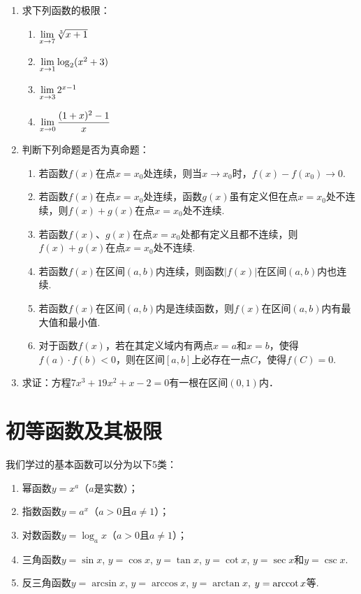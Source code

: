 \begin{ex}
\begin{enumerate}
    \item 求下列函数的极限：
\begin{multicols}{2}
\begin{enumerate}[(1)]
    \item $\lim\limits_{x\to 7}\sqrt[3]{x+1}$
    \item $\lim\limits_{x\to 1}\log_2(x^2+3)$
    \item $\lim\limits_{x\to 3}2^{x-1}$
    \item $\lim\limits_{x\to 0}\dfrac{(1+x)^2-1}{x}$
\end{enumerate}
\end{multicols}
\item 判断下列命题是否为真命题：
\begin{enumerate}[(1)]
\item 若函数$f(x)$在点$x=x_0$处连续，则当$x\to x_0$时，$f(x)-f(x_0)\to 0$.
\item 若函数$f(x)$在点$x=x_0$处连续，函数$g(x)$虽有定义但在点$x=x_0$处不连续，则$f(x)+g(x)$在点$x=x_0$处不连续.
\item 若函数$f(x)$、$g(x)$在点$x=x_0$处都有定义且都不连续，则$f(x)+g(x)$在点$x=x_0$处不连续.
\item 若函数$f(x)$在区间$(a,b)$内连续，则函数$|f(x)|$在区间$(a,b)$内也连续.
\item 若函数$f(x)$在区间$(a,b)$内是连续函数，则$f(x)$在区间$(a,b)$内有最大值和最小值.
\item 对于函数$f(x)$，若在其定义域内有两点$x=a$和$x=b$，使得$f(a)\cdot f(b)<0$，则在区间$[a,b]$上必存在一点$C$，使得$f(C)=0$.
\end{enumerate}

\item 求证：方程$7x^3+19x^2+x-2=0$有一根在区间$(0,1)$内．
\end{enumerate}
\end{ex}

\section{初等函数及其极限}

我们学过的基本函数可以分为以下5类：
\begin{enumerate}
\item 幂函数$y=x^{a}$（$a$是实数）；
\item 指数函数$y=a^x$（$a>0$且$a\ne 1$）；
\item 对数函数$y=\log_a x$（$a>0$且$a\ne 1$）；
\item 三角函数$y=\sin x$, $y=\cos x$, $y=\tan x$, $y=\cot x$, $y=\sec x$和$y=\csc x$.
\item 反三角函数$y=\arcsin x$, $y=\arccos x$, $y=\arctan x$, $y={\rm arccot\, }x$等.
\end{enumerate}

